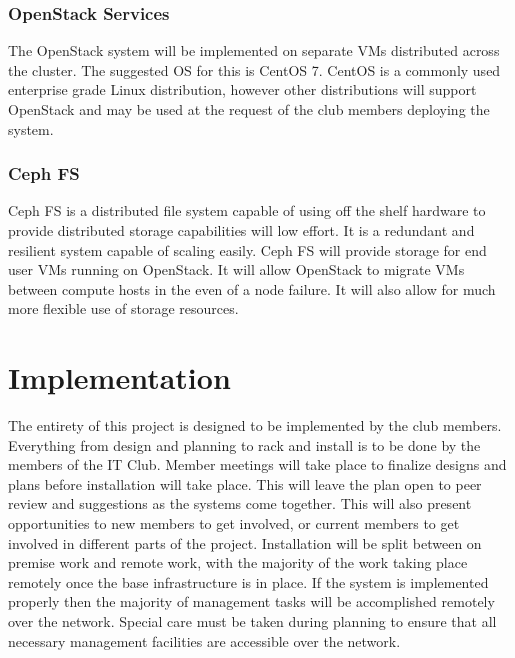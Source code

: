 \documentclass[12pt]{article}
\begin{document}
\subsubsection{OpenStack Services}
The OpenStack system will be implemented on separate VMs distributed across the cluster. The suggested OS for this is CentOS 7. CentOS
is a commonly used enterprise grade Linux distribution, however other distributions will support OpenStack and may be used at the
request of the club members deploying the system. 

\subsubsection{Ceph FS}
Ceph FS is a distributed file system capable of using off the shelf hardware to provide distributed storage capabilities will low effort.
It is a redundant and resilient system capable of scaling easily. Ceph FS will provide storage for end user VMs running on OpenStack. 
It will allow OpenStack to migrate VMs between compute hosts in the even of a node failure. It will also allow for much more flexible
use of storage resources.

\section{Implementation}
The entirety of this project is designed to be implemented by the club members. Everything from design and planning to rack and install
is to be done by the members of the IT Club. Member meetings will take place to finalize designs and plans before installation will take 
place. This will leave the plan open to peer review and suggestions as the systems come together. This will also present opportunities to
new members to get involved, or current members to get involved in different parts of the project. Installation will be split between on
premise work and remote work, with the majority of the work taking place remotely once the base infrastructure is in place. If the system
is implemented properly then the majority of management tasks will be accomplished remotely over the network. Special care must be taken
during planning to ensure that all necessary management facilities are accessible over the network.  
\end{document}
